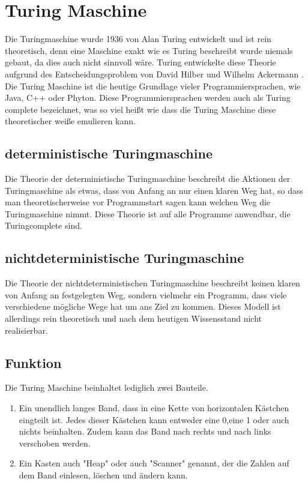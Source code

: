 \section{Turing Maschine}
\label{turingmaschine}
Die Turingmaschine wurde 1936 von Alan Turing entwickelt und ist rein theoretisch, denn eine Maschine exakt wie es Turing beschreibt wurde niemals gebaut, da dies auch nicht sinnvoll wäre. Turing entwickelte diese Theorie aufgrund des Entscheidungsproblem von David Hilber und Wilhelm Ackermann \cite{theessentialturing}. Die Turing Maschine ist die heutige Grundlage vieler Programmiersprachen, wie Java, C++ oder Phyton. Diese Programmiersprachen werden auch als Turing complete bezeichnet, was so viel heißt wie dass die Turing Maschine diese theoretischer weiße emulieren kann.

\subsection{deterministische Turingmaschine}
Die Theorie der deterministische Turingmaschine beschreibt die Aktionen der Turingmaschine als etwas, dass von Anfang an nur einen klaren Weg hat, so dass man theoretischerweise vor Programmstart sagen kann welchen Weg die Turingmaschine nimmt. Diese Theorie ist auf alle Programme anwendbar, die Turingcomplete sind.

\subsection{nichtdeterministische Turingmaschine}
Die Theorie der nichtdeterministischen Turingmaschine beschreibt keinen klaren von Anfang an festgelegten Weg, sondern vielmehr ein Programm, dass viele verschiedene mögliche Wege hat um ans Ziel zu kommen. Dieses Modell ist allerdings rein theoretisch und nach dem heutigen Wissensstand nicht realisierbar.

\subsection{Funktion} 
Die Turing Maschine beinhaltet lediglich zwei Bauteile.
\begin{enumerate}
\item  Ein unendlich langes Band, dass in eine Kette von horizontalen Kästchen eingteilt ist. Jedes dieser Kästchen kann entweder eine 0,eine 1 oder auch nichts beinhalten. Zudem kann das Band nach rechts und nach links verschoben werden.
\item Ein Kasten auch "Heap" oder auch "Scanner" genannt, der die Zahlen auf dem Band einlesen, löschen und ändern kann.
\end{enumerate}
 
